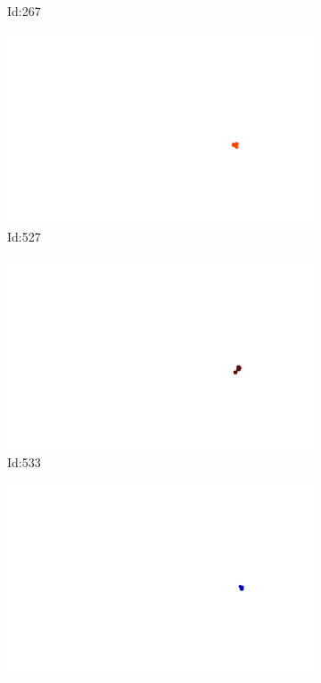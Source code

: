 \documentclass[12pt,twoside]{report}
\begin{document}
\begin{figure}
\begin{subfigure}[b]{0.20\textwidth}
\caption{Id:267}
\end{subfigure}
\begin{subfigure}[b]{0.20\textwidth}
\centering
\includegraphics[width=\textwidth]{../../trajectories/527.png}
\caption{Id:527}
\end{subfigure}
\begin{subfigure}[b]{0.20\textwidth}
\centering
\includegraphics[width=\textwidth]{../../trajectories/533.png}
\caption{Id:533}
\end{subfigure}
\begin{subfigure}[b]{0.20\textwidth}
\centering
\includegraphics[width=\textwidth]{../../trajectories/651.png}

\end{subfigure}
\end{figure}
\end{document}
